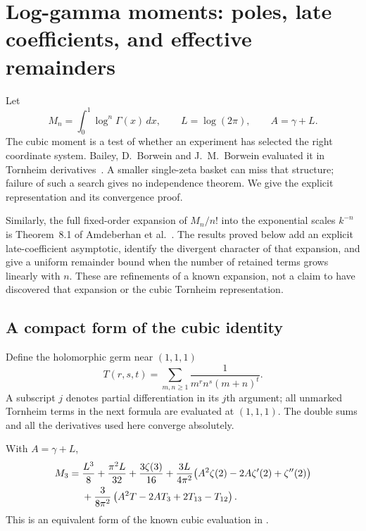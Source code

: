 \section{Log-gamma moments: poles, late coefficients, and effective remainders}
\label{gaussian:sec:gamma}
Let
\[
 M_n=\int_0^1\log^n\Gamma(x)\,dx,\qquad L=\log(2\pi),\qquad A=\gamma+L.
\]
The cubic moment is a test of whether an experiment has selected the right
coordinate system. Bailey, D.~Borwein and J.~M.~Borwein evaluated it in
Tornheim derivatives~\cite[Theorem~6]{gaussian:BBB}. A smaller single-zeta
basket can miss that structure; failure of such a search gives no independence
theorem. We give the explicit representation and its convergence proof.

Similarly, the full fixed-order expansion of $M_n/n!$ into the exponential
scales $k^{-n}$ is Theorem~8.1 of Amdeberhan et al.\ \cite{gaussian:ACEMKM}.
The results proved below add an explicit late-coefficient asymptotic, identify
the divergent character of that expansion, and give a uniform remainder
bound when the number of retained terms grows linearly with $n$.
These are refinements of a known expansion, not a claim to have discovered
that expansion or the cubic Tornheim representation.

\subsection{A compact form of the cubic identity}
Define the holomorphic germ near $(1,1,1)$
\[
 T(r,s,t)=\sum_{m,n\ge1}\frac{1}{m^r n^s(m+n)^t}.
\]
A subscript $j$ denotes partial differentiation in its $j$th argument;
all unmarked Tornheim terms in the next formula are evaluated at $(1,1,1)$.
The double sums and all the derivatives used here converge absolutely.

\begin{theorem}
\label{gaussian:thm:cubic-compact}
With $A=\gamma+L$,
\begin{align}
 M_3={}&\frac{L^3}{8}+\frac{\pi^2L}{32}+\frac{3\zeta(3)}{16}
 +\frac{3L}{4\pi^2}
 \bigl(A^2\zeta(2)-2A\zeta'(2)+\zeta''(2)\bigr)\notag\\
 &+\frac{3}{8\pi^2}
 \left(A^2T-2AT_3+2T_{13}-T_{12}\right).
 \label{gaussian:eq:cubic-compact}
\end{align}
This is an equivalent form of the known cubic evaluation in
\cite[Theorem~6]{gaussian:BBB}.
\end{theorem}


